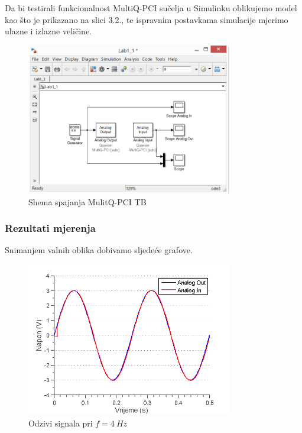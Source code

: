 \documentclass[12pt,a4paper]{article}
\begin{document}
Da bi testirali funkcionalnost MultiQ-PCI sučelja u Simulinku oblikujemo model kao što je prikazano na slici 3.2., te ispravnim postavkama simulacije mjerimo ulazne i izlazne veličine.

\begin{figure}[h]
	\begin{center}
	\includegraphics[width=0.8\textwidth] {modelprvi.png}
    \caption{Shema spajanja MulitQ-PCI TB}
    \end{center}
\end{figure}

\newpage
\subsubsection{Rezultati mjerenja}
Snimanjem valnih oblika dobivamo sljedeće grafove.\newline


\begin{figure}[h]
	\begin{center}
	\includegraphics[width=0.8\textwidth] {prvi4.png}
    \caption{Odzivi signala pri $f=4\ Hz$}
    \end{center}
\end{figure}
\end{document}
